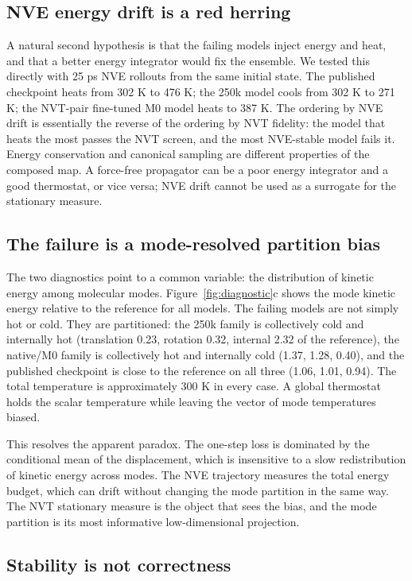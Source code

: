 \subsection{NVE energy drift is a red herring}

A natural second hypothesis is that the failing models inject energy and heat, and that a better
energy integrator would fix the ensemble. We tested this directly with 25 ps NVE rollouts from the
same initial state. The published checkpoint heats from 302 K to 476 K; the 250k model cools from
302 K to 271 K; the NVT-pair fine-tuned M0 model heats to 387 K. The ordering by NVE drift is
essentially the reverse of the ordering by NVT fidelity: the model that heats the most passes the
NVT screen, and the most NVE-stable model fails it. Energy conservation and canonical sampling are
different properties of the composed map. A force-free propagator can be a poor energy integrator
and a good thermostat, or vice versa; NVE drift cannot be used as a surrogate for the stationary
measure.

\subsection{The failure is a mode-resolved partition bias}

The two diagnostics point to a common variable: the distribution of kinetic energy among molecular
modes. Figure~\ref{fig:diagnostic}c shows the mode kinetic energy relative to the reference for all
models. The failing models are not simply hot or cold. They are partitioned: the 250k family is
collectively cold and internally hot (translation 0.23, rotation 0.32, internal 2.32 of the
reference), the native/M0 family is collectively hot and internally cold (1.37, 1.28, 0.40), and
the published checkpoint is close to the reference on all three (1.06, 1.01, 0.94). The total
temperature is approximately 300 K in every case. A global thermostat holds the scalar temperature
while leaving the vector of mode temperatures biased.

This resolves the apparent paradox. The one-step loss is dominated by the conditional mean of the
displacement, which is insensitive to a slow redistribution of kinetic energy across modes. The
NVE trajectory measures the total energy budget, which can drift without changing the mode
partition in the same way. The NVT stationary measure is the object that sees the bias, and the
mode partition is its most informative low-dimensional projection.

\subsection{Stability is not correctness}

